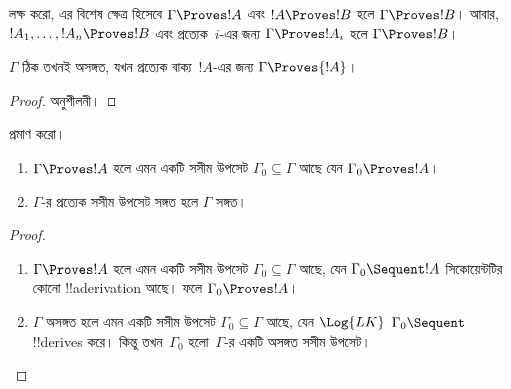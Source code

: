 \documentclass[../../../include/open-logic-section]{subfiles}
\begin{document}
লক্ষ করো, এর বিশেষ ক্ষেত্র হিসেবে $\Gamma \Proves !A$ এবং
$!A \Proves !B$ হলে $\Gamma \Proves !B$। আবার, $!A_1,
\dots, !A_n \Proves !B$ এবং প্রত্যেক~$i$-এর জন্য $\Gamma \Proves !A_i$
হলে $\Gamma \Proves !B$।

\begin{prop}
$\Gamma$ ঠিক তখনই অসঙ্গত, যখন প্রত্যেক বাক্য~$!A$-এর জন্য
$\Gamma \Proves {!A}$।
\end{prop}

\begin{proof}
অনুশীলনী।
\end{proof}

\begin{prob}
 প্রমাণ করো।
\end{prob}

\begin{prop}[সংহতি]
  \begin{enumerate}
  \item $\Gamma \Proves !A$ হলে এমন একটি সসীম উপসেট $\Gamma_0
    \subseteq \Gamma$ আছে যেন $\Gamma_0 \Proves !A$।
  \item $\Gamma$-র প্রত্যেক সসীম উপসেট সঙ্গত হলে $\Gamma$ সঙ্গত।
  \end{enumerate}
\end{prop}

\begin{proof}
  \begin{enumerate}
    \item $\Gamma \Proves !A$ হলে এমন একটি সসীম উপসেট
      $\Gamma_0 \subseteq \Gamma$ আছে, যেন $\Gamma_0
      \Sequent !A$ সিকোয়েন্টটির কোনো !!a{derivation} আছে। ফলে
      $\Gamma_0 \Proves !A$।
    \item $\Gamma$ অসঙ্গত হলে এমন একটি সসীম উপসেট
      $\Gamma_0 \subseteq \Gamma$ আছে, যেন $\Log{LK}$
      $\Gamma_0 \Sequent \quad$ !!{derive}s করে। কিন্তু তখন~$\Gamma_0$
      হলো~$\Gamma$-র একটি অসঙ্গত সসীম উপসেট।
  \end{enumerate}
\end{proof}
\end{document}
